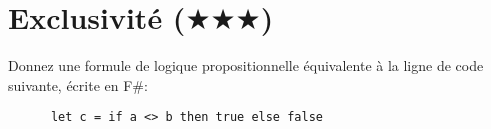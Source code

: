 \documentclass[a4paper, titlepage]{article}
\numberwithin{figure}{section}
\numberwithin{table}{section}
\begin{document}
  \section{Exclusivité ($\bigstar\bigstar\bigstar$)}
    Donnez une formule de logique propositionnelle équivalente à la ligne de code suivante,
    écrite en F\#:
    \begin{verbatim}
      let c = if a <> b then true else false
    \end{verbatim}
\end{document}
